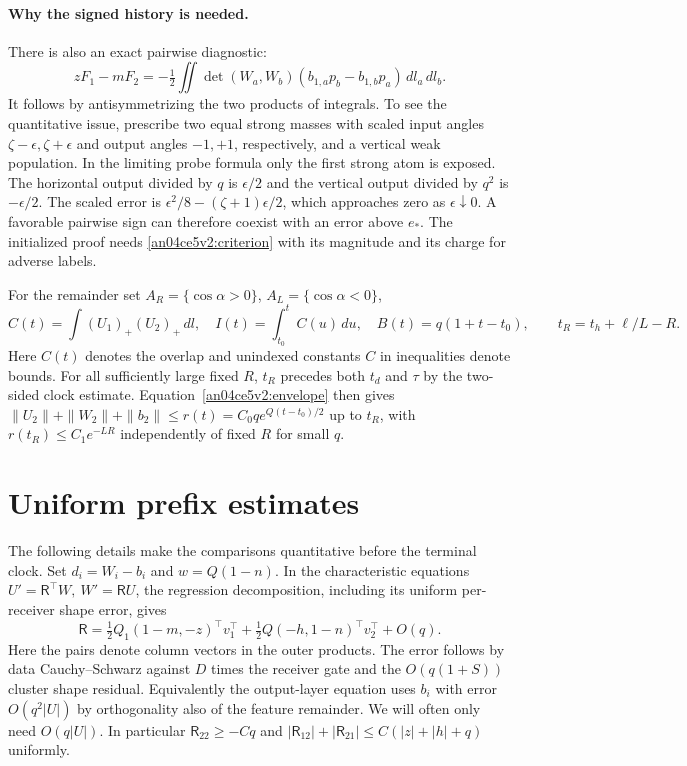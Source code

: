 \documentclass[11pt]{article}
\newcommand{\dd}{\,dl}
\begin{document}
\paragraph{Why the signed history is needed.}
There is also an exact pairwise diagnostic:
\[
 zF_1-mF_2=-\tfrac12\iint\det(W_a,W_b)
   (b_{1,a}p_b-b_{1,b}p_a)\,dl_a\,dl_b .
\]
It follows by antisymmetrizing the two products of integrals. To see the quantitative issue, prescribe two equal strong masses with scaled input angles $\zeta-\epsilon,\zeta+\epsilon$ and output angles $-1,+1$, respectively, and a vertical weak population. In the limiting probe formula only the first strong atom is exposed. The horizontal output divided by $q$ is $\epsilon/2$ and the vertical output divided by $q^2$ is $-\epsilon/2$. The scaled error is $\epsilon^2/8-(\zeta+1)\epsilon/2$, which approaches zero as $\epsilon\downarrow0$. A favorable pairwise sign can therefore coexist with an error above $e_*$. The initialized proof needs \eqref{an04ce5v2:criterion} with its magnitude and its charge for adverse labels.

For the remainder set $A_R=\{\cos\alpha>0\}$, $A_L=\{\cos\alpha<0\}$,
\[
 C(t)=\int (U_1)_+(U_2)_+\dd,\quad I(t)=\int_{t_0}^t C(u)\,du,\quad
 B(t)=q(1+t-t_0),\qquad t_R=t_h+\ell/L-R .
\]
Here $C(t)$ denotes the overlap and unindexed constants $C$ in inequalities denote bounds. For all sufficiently large fixed $R$, $t_R$ precedes both $t_d$ and $\tau$ by the two-sided clock estimate. Equation~\eqref{an04ce5v2:envelope} then gives $\|U_2\|+\|W_2\|+\|b_2\|\le r(t)=C_0q e^{Q(t-t_0)/2}$ up to $t_R$, with $r(t_R)\le C_1e^{-LR}$ independently of fixed $R$ for small $q$.

\section{Uniform prefix estimates}\label{an04ce5v2:prefixsec}
The following details make the comparisons quantitative before the
terminal clock. Set $d_i=W_i-b_i$ and $w=Q(1-n)$. In the characteristic
equations $U'=\mathsf R^\top W,\ W'=\mathsf R U$, the regression
decomposition, including its uniform per-receiver shape error, gives
\[
 \mathsf R=\tfrac12 Q_1(1-m,-z)^\top v_1^\top+
            \tfrac12 Q(-h,1-n)^\top v_2^\top+O(q).
\]
Here the pairs denote column vectors in the outer products. The error
follows by data Cauchy--Schwarz against $D$ times the receiver gate and
the $O(q(1+S))$ cluster shape residual. Equivalently the output-layer
equation uses $b_i$ with error $O(q^2|U|)$ by orthogonality also of the
feature remainder. We will often only need $O(q|U|)$.
In particular $\mathsf R_{22}\ge-Cq$ and
$|\mathsf R_{12}|+|\mathsf R_{21}|\le C(|z|+|h|+q)$ uniformly.
\end{document}
